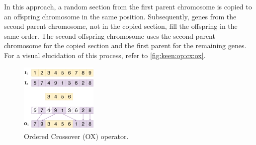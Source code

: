   In this approach, a random section from the first parent chromosome is copied 
  to an offspring chromosome in the same position. Subsequently, genes from the 
  second parent chromosome, not in the copied section, fill the offspring in 
  the same order. The second offspring chromosome uses the second parent 
  chromosome for the copied section and the first parent for the remaining 
  genes. For a visual elucidation of this process, refer to 
  \vref{fig:keen:op:cx:ox}.

  \begin{figure}[ht!]
    \centering
    \includegraphics[width=0.33\textwidth]{img/keen/OX.png}
    \caption{Ordered Crossover (OX) operator.}
    \label{fig:keen:op:cx:ox}
  \end{figure}
